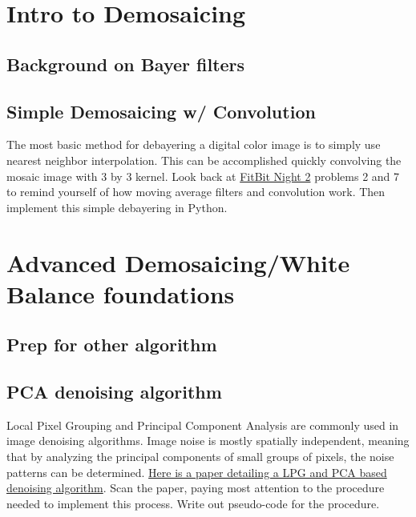 \documentclass{tufte-handout}
\begin{document}
\section{Intro to Demosaicing}
\subsection{Background on Bayer filters}  %



\subsection{Simple Demosaicing w/ Convolution}
The most basic method for debayering a digital color image is to simply use nearest neighbor interpolation. This can be accomplished quickly convolving the mosaic image with 3 by 3 kernel. Look back at \href{https://drive.google.com/file/d/1_eEtwNDHhF-Izfcf6l00PvG-b6whwety/view}{FitBit Night 2} problems 2 and 7 to remind yourself of how moving average filters and convolution work. Then implement this simple debayering in Python.


\section{Advanced Demosaicing/White Balance foundations}

\subsection{Prep for other algorithm}  %

\subsection{PCA denoising algorithm}  %
Local Pixel Grouping and Principal Component Analysis are commonly used in image denoising algorithms. Image noise is mostly spatially independent, meaning that by analyzing the principal components of small groups of pixels, the noise patterns can be determined.
\href{https://www4.comp.polyu.edu.hk/~cslzhang/paper/PR_10_x_3.pdf}{Here is a paper detailing a LPG and PCA based denoising algorithm}. Scan the paper, paying most attention to the procedure needed to implement this process. Write out pseudo-code for the procedure. %
\end{document}
